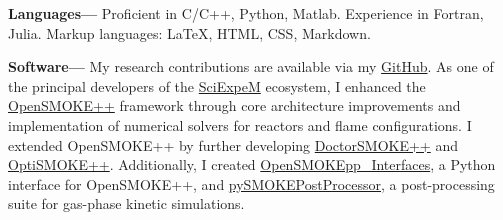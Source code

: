 {\bf Languages---}
Proficient in C/C++, Python, Matlab. Experience in Fortran, Julia. Markup
languages: \LaTeX, HTML, CSS, Markdown.


{\bf Software---}
My research contributions are available via my
\href{https://github.com/tdinelli}{GitHub}. As one of the principal developers of the
\href{https://sciexpem.polimi.it/}{SciExpeM} ecosystem, I enhanced the
\href{https://www.opensmokepp.polimi.it/}{OpenSMOKE++} framework through core
architecture improvements and implementation of numerical solvers for reactors and flame
configurations. I extended OpenSMOKE++ by further developing
\href{https://www.opensmokepp.polimi.it/}{DoctorSMOKE++} and
\href{https://github.com/burn-research/OptiSMOKE_toolbox}{OptiSMOKE++}. Additionally, I
created
\href{https://github.com/tdinelli/OpenSMOKEpp_Interfaces}{OpenSMOKEpp\_Interfaces}, a
Python interface for OpenSMOKE++, and
\href{https://github.com/tdinelli/pySMOKEPostProcessor}{pySMOKEPostProcessor}, a
post-processing suite for gas-phase kinetic simulations.
